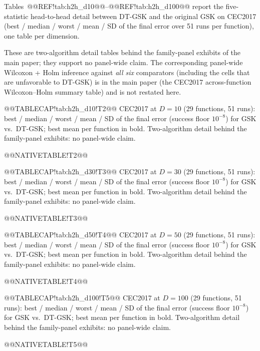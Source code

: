 \documentclass[10pt,a4paper]{article}
\newcommand{\dtgsk}{DT-GSK}
\begin{document}
Tables~@@REF!tab:h2h\_d10@@--@@REF!tab:h2h\_d100@@ report the five-statistic
head-to-head detail between \dtgsk{} and the original GSK on CEC2017
(best / median / worst / mean / SD of the final error over 51 runs per
function), one table per dimension.

These are two-algorithm detail tables behind the family-panel exhibits
of the main paper; they support no panel-wide claim.  The corresponding
panel-wide Wilcoxon + Holm inference against \emph{all six} comparators
(including the cells that are unfavorable to \dtgsk{}) is in the
main paper (the CEC2017 across-function Wilcoxon--Holm summary table) and is not restated here.



@@TABLECAP!tab:h2h\_d10!T2@@ CEC2017 at $D = 10$ (29 functions, 51 runs): best / median /
worst / mean / SD of the final error (success floor $10^{-8}$) for GSK
vs.\ \dtgsk{}; best mean per function in bold.  Two-algorithm detail
behind the family-panel exhibits: no panel-wide claim.

@@NATIVETABLE!T2@@





@@TABLECAP!tab:h2h\_d30!T3@@ CEC2017 at $D = 30$ (29 functions, 51 runs): best / median /
worst / mean / SD of the final error (success floor $10^{-8}$) for GSK
vs.\ \dtgsk{}; best mean per function in bold.  Two-algorithm detail
behind the family-panel exhibits: no panel-wide claim.

@@NATIVETABLE!T3@@





@@TABLECAP!tab:h2h\_d50!T4@@ CEC2017 at $D = 50$ (29 functions, 51 runs): best / median /
worst / mean / SD of the final error (success floor $10^{-8}$) for GSK
vs.\ \dtgsk{}; best mean per function in bold.  Two-algorithm detail
behind the family-panel exhibits: no panel-wide claim.

@@NATIVETABLE!T4@@





@@TABLECAP!tab:h2h\_d100!T5@@ CEC2017 at $D = 100$ (29 functions, 51 runs): best / median /
worst / mean / SD of the final error (success floor $10^{-8}$) for GSK
vs.\ \dtgsk{}; best mean per function in bold.  Two-algorithm detail
behind the family-panel exhibits: no panel-wide claim.

@@NATIVETABLE!T5@@
\end{document}
